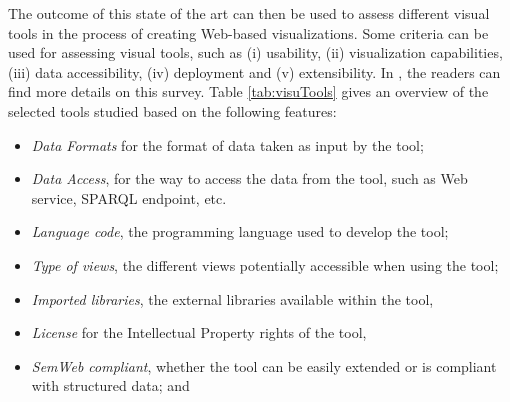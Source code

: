 The outcome of this state of the art can then be used to assess different visual tools in the process of creating Web-based visualizations. Some criteria can be used for assessing visual tools, such as (i) usability, (ii) visualization capabilities, (iii) data accessibility, (iv) deployment and (v) extensibility. In \cite{deliverable2012b}, the readers can find more details on this survey. Table \ref{tab:visuTools} gives an overview of the selected tools studied based on the following features:
\begin{itemize}
\item \textit{Data Formats} for the format of data taken as input by the tool;
\item \textit{Data Access}, for the way to access the data from the tool, such as Web service, SPARQL endpoint, etc.
\item \textit{Language code}, the programming language used to develop the tool;
\item \textit{Type of views}, the different views potentially accessible when using the tool;
\item \textit{Imported libraries}, the external libraries available within the tool,
\item \textit{License} for the Intellectual Property rights of the tool,
\item \textit{SemWeb compliant}, whether the tool can be easily extended or is compliant with structured data; and

\end{itemize}

